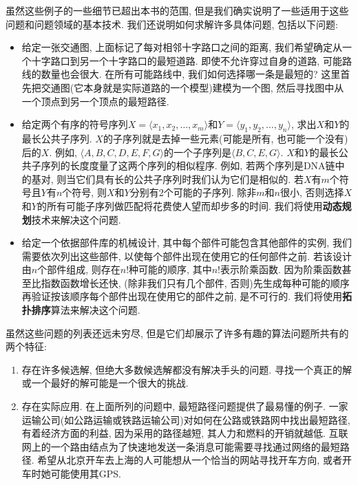 \documentclass[oneside,10pt]{ctexbook}
\begin{document}
虽然这些例子的一些细节已超出本书的范围, 但是我们确实说明了一些适用于这些问题和问题领域的基本技术. 我们还说明如何求解许多具体问题, 包括以下问题:

\begin{itemize}
    \item 给定一张交通图, 上面标记了每对相邻十字路口之间的距离, 我们希望确定从一个十字路口到另一个十字路口的最短道路. 即使不允许穿过自身的道路, 可能路线的数量也会很大. 在所有可能路线中, 我们如何选择哪一条是最短的? 这里首先把交通图(它本身就是实际道路的一个模型)建模为一个图, 然后寻找图中从一个顶点到另一个顶点的最短路径.
    \item 给定两个有序的符号序列$X = \langle x_1, x_2, \dots, x_m\rangle$和$Y=\langle y_1, y_2, \dots, y_n\rangle$, 求出$X$和$Y$的最长公共子序列. $X$的子序列就是去掉一些元素(可能是所有, 也可能一个没有)后的$X$. 例如, $\langle A, B, C, D, E, F, G\rangle$的一个子序列是$\langle B, C, E, G\rangle$. $X$和$Y$的最长公共子序列的长度度量了这两个序列的相似程序. 例如, 若两个序列是DNA链中的基对, 则当它们具有长的公共子序列时我们认为它们是相似的. 若$X$有$m$个符号且$Y$有$n$个符号, 则$X$和$Y$分别有2个可能的子序列. 除非$m$和$n$很小, 否则选择$X$和$Y$的所有可能子序列做匹配将花费使人望而却步多的时间. 我们将使用\textbf{动态规划}技术来解决这个问题.
    \item 给定一个依据部件库的机械设计, 其中每个部件可能包含其他部件的实例, 我们需要依次列出这些部件, 以使每个部件出现在使用它的任何部件之前. 若该设计由$n$个部件组成, 则存在$n!$种可能的顺序, 其中$n!$表示阶乘函数. 因为阶乘函数甚至比指数函数增长还快, (除非我们只有几个部件, 否则)先生成每种可能的顺序再验证按该顺序每个部件出现在使用它的部件之前, 是不可行的. 我们将使用\textbf{拓扑排序}算法来解决这个问题.
\end{itemize}

虽然这些问题的列表还远未穷尽, 但是它们却展示了许多有趣的算法问题所共有的两个特征:

\begin{enumerate}
    \item 存在许多候选解, 但绝大多数候选解都没有解决手头的问题. 寻找一个真正的解或一个最好的解可能是一个很大的挑战.
    \item 存在实际应用. 在上面所列的问题中, 最短路径问题提供了最易懂的例子. 一家运输公司(如公路运输或铁路运输公司)对如何在公路或铁路网中找出最短路径, 有着经济方面的利益, 因为采用的路径越短, 其人力和燃料的开销就越低. 互联网上的一个路由结点为了快速地发送一条消息可能需要寻找通过网络的最短路径. 希望从北京开车去上海的人可能想从一个恰当的网站寻找开车方向, 或者开车时她可能使用其GPS.
\end{enumerate}
\end{document}
